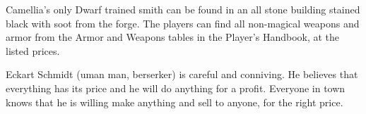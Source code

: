 Camellia's only Dwarf trained smith can be found in an all stone building stained black with soot from the forge.
The players can find all non-magical weapons and armor from the Armor and Weapons tables in the Player's Handbook, at the listed prices.

Eckart Schmidt (uman man, berserker) is careful and conniving.
He believes that everything has its price and he will do anything for a profit.
Everyone in town knows that he is willing make anything and sell to anyone, for the right price.
